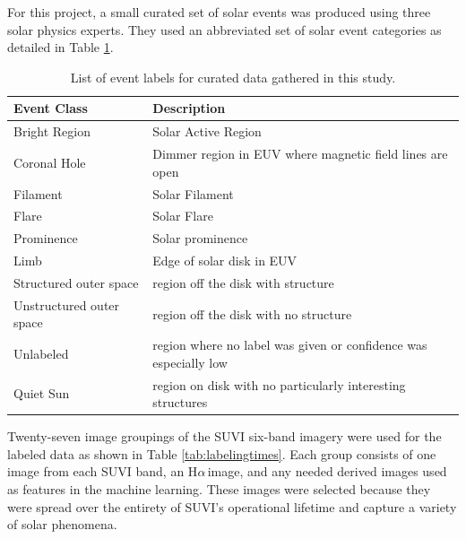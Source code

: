 \documentclass[twoside]{report}
\newcommand{\halpha}{H$\alpha$\,}
\begin{document}
For this project, a small curated set of solar events was produced using three solar physics experts. They used an abbreviated set of solar event categories as detailed in Table \ref{tab:mylabels}.  

\begin{table}[ht!]
  \centering
  \begin{tabular}{|p{4cm} p{10cm}|}
    \hline
    Event Class & Description \\ \hline
    Bright Region & Solar Active Region\\
    Coronal Hole & Dimmer region in EUV where magnetic field lines are open\\
    Filament & Solar Filament \\
    Flare & Solar Flare \\
    Prominence & Solar prominence \\
    Limb & Edge of solar disk in EUV \\
    Structured outer space & region off the disk with structure \\
    Unstructured outer space & region off the disk with no structure \\
    Unlabeled & region where no label was given or confidence was especially low \\
    Quiet Sun & region on disk with no particularly interesting structures \\
    \hline             
  \end{tabular}
  \caption{List of event labels for curated data gathered in this study.}
  \label{tab:mylabels}
\end{table}

Twenty-seven image groupings of the SUVI six-band imagery were used for the labeled data as shown in Table \ref{tab:labelingtimes}. Each group consists of one image from each SUVI band, an \halpha image, and any needed derived images used as features in the machine learning. These images were selected because they were spread over the entirety of SUVI's operational lifetime and capture a variety of solar phenomena. 
\end{document}
